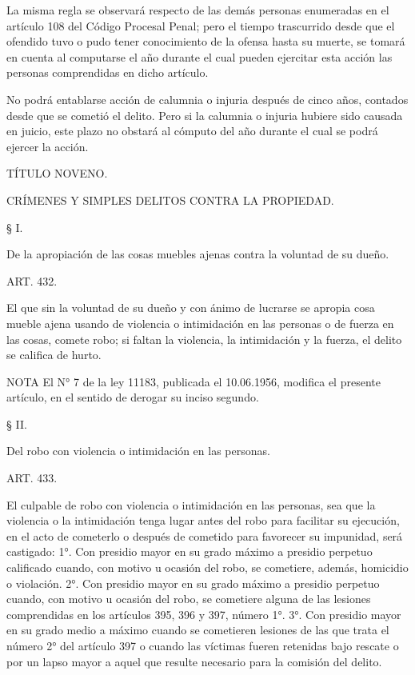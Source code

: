     La misma regla se observará respecto de las demás personas enumeradas en el artículo 108 del Código Procesal Penal; pero el tiempo trascurrido desde que el ofendido tuvo o pudo tener conocimiento de la ofensa hasta su muerte, se tomará en cuenta al computarse el año durante el cual pueden ejercitar esta acción las personas comprendidas en dicho artículo.

    No podrá entablarse acción de calumnia o injuria después de cinco años, contados desde que se cometió el delito. Pero si la calumnia o injuria hubiere sido causada en juicio, este plazo no obstará al cómputo del año durante el cual se podrá ejercer la acción.


    TÍTULO NOVENO.

    CRÍMENES Y SIMPLES DELITOS CONTRA LA PROPIEDAD.








    § I.

    De la apropiación de las cosas muebles ajenas contra la voluntad de su dueño.





    ART. 432.

    El que sin la voluntad de su dueño y con ánimo de lucrarse se apropia cosa mueble ajena usando de violencia o intimidación en las personas o de fuerza en las cosas, comete robo; si faltan la violencia, la intimidación y la fuerza, el delito se califica de hurto.
   


NOTA
      El N° 7 de la ley 11183, publicada el 10.06.1956, modifica el presente artículo, en el sentido de derogar su inciso segundo.

    § II.

    Del robo con violencia o intimidación en las personas.




    ART. 433.

    El culpable de robo con violencia o intimidación en las personas, sea que la violencia o la intimidación tenga lugar antes del robo para facilitar su ejecución, en el acto de cometerlo o después de cometido para favorecer su impunidad, será castigado:
    1°. Con presidio mayor en su grado máximo a presidio perpetuo calificado cuando, con motivo u ocasión del robo, se cometiere, además, homicidio o violación.
    2°. Con presidio mayor en su grado máximo a presidio perpetuo cuando, con motivo u ocasión del robo, se cometiere alguna de las lesiones comprendidas en los artículos 395, 396 y 397, número 1°.
    3°. Con presidio mayor en su grado medio a máximo cuando se cometieren lesiones de las que trata el número 2° del artículo 397 o cuando las víctimas fueren retenidas bajo rescate o por un lapso mayor a aquel que resulte necesario para la comisión del delito.

